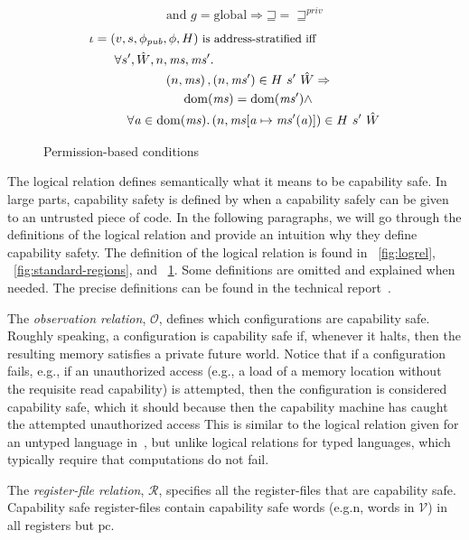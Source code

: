 \documentclass[compsoc,conference,letterpaper,fleqn]{IEEEtran}
\newcommand{\update}[2]{[#1 \mapsto #2]}
\DeclareMathOperator{\dom}{dom}
\newcommand{\var}[1]{\mathit{#1}}
\newcommand{\hs}{\var{ms}}
\newcommand{\ms}{\hs}
\newcommand{\gl}{\var{g}}
\newcommand{\pcreg}{\mathrm{pc}}
\newcommand{\addr}{\var{a}}
\newcommand{\future}{\mathbin{\sqsupseteq}}
\newcommand{\pub}{\var{pub}}
\newcommand{\futurestr}{\mathbin{\sqsupseteq}^{\var{priv}}}
\newcommand{\asmType}{\plaindom{AsmType}}
\newcommand{\plaindom}[1]{\mathrm{#1}}
\newcommand{\intr}[2]{\mathcal{#1}}
\newcommand{\valueintr}[1]{\intr{V}{#1}}
\newcommand{\regintr}[1]{\intr{R}{#1}}
\newcommand{\stdvr}{\valueintr{\asmType}}
\newcommand{\stdrr}{\regintr{\asmType}}
\newcommand{\observations}{\mathcal{O}}
\newcommand{\npair}[2][n]{\left(#1,#2 \right)}
\newcommand{\plainperm}[1]{\mathrm{#1}}
\newcommand{\glob}{\plainperm{global}}
\begin{document}
{\begin{figure}[htbp]
\begin{align*}
  & \quad \text{and } \gl = \glob \Rightarrow \future = \futurestr
\end{align*}
  \begin{align*}
    &\iota = (v,s,\phi_\pub,\phi,H) \text{\footnotesize{ is address-stratified iff}}\\
    &\qquad\begin{multlined}
      \forall s', \hat{W}, n, \ms, \ms' \ldotp \\
      \npair{\ms},\npair{\ms'} \in H~ s'~ \hat{W} \Rightarrow \\
      \dom(\ms) = \dom(\ms') \wedge \\
      \forall \addr \in
      \dom(\ms)\ldotp \npair{\ms\update{\addr}{\ms'(\addr)}} \in H~ s'~ \hat{W}
    \end{multlined}
  \end{align*}

\caption{Permission-based conditions}
\label{fig:perm-conds}
\end{figure}
}
The logical relation defines semantically what it means to be
capability safe. In large parts, capability safety is defined by
when a capability safely can be given to an untrusted piece of
code. In the following paragraphs, we will go through the definitions
of the logical relation and provide an intuition why they define
capability safety.
The definition of the logical relation is found in
\figurename~\ref{fig:logrel}, \figurename~\ref{fig:standard-regions},
and \figurename~\ref{fig:perm-conds}. Some definitions are omitted and
explained when needed. The precise definitions can be found in the
technical report~\cite{XXX}.

The \emph{observation relation}, $\observations$, defines which
configurations are capability safe. Roughly speaking,
a configuration is capability safe if, whenever it halts, then
the resulting memory satisfies a private future world. 
Notice that if a configuration fails, e.g., if an unauthorized access 
(e.g., a load of a memory location without the requisite read capability)
is attempted, then the configuration is considered capability safe, which it should
because then the capability machine has caught the attempted unauthorized access
This is similar to the logical relation given for an untyped language
in~\cite{Devriese:2016ObjCap}, but unlike logical relations for typed languages, which
typically require that computations do not fail. 

The \emph{register-file relation}, $\stdrr$, specifies all the
register-files that are capability safe. Capability safe
register-files contain capability safe words (e.g.n, words in
$\stdvr$) in all registers but $\pcreg$.
\end{document}
